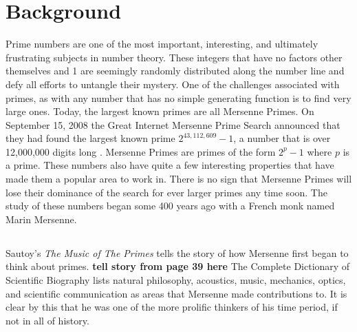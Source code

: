 \section{Background}

Prime numbers are one of the most important, interesting, and ultimately frustrating subjects in number theory. These integers that have no factors other themselves and 1 are seemingly randomly distributed along the number line and defy all efforts to untangle their mystery. One of the challenges associated with primes, as with any number that has no simple generating function is to find very large ones.  Today, the largest known primes are all Mersenne Primes.  On September 15, 2008 the Great Internet Mersenne Prime Search announced that they had found the largest known prime $2^{43,112,609}-1$, a number that is over 12,000,000 digits long \cite{gimps}.  Mersenne Primes are primes of the form $2^p - 1$ where $p$ is a prime.  These numbers also have quite a few interesting properties that have made them a popular area to work in. There is no sign that Mersenne Primes will lose their dominance of the search for ever larger primes any time soon.  The study of these numbers began some 400 years ago with a French monk named Marin Mersenne. 

\subsection{}

Sautoy's \textit{The Music of The Primes} \cite{sautoy} tells the story of how Mersenne first began to think about primes. \textbf{tell story from page 39 here} The Complete Dictionary of Scientific Biography\cite{scibio} lists natural philosophy, acoustics, music, mechanics, optics, and scientific communication as areas that Mersenne made contributions to.  It is clear by this that he was one of the more prolific thinkers of his time period, if not in all of history.  


